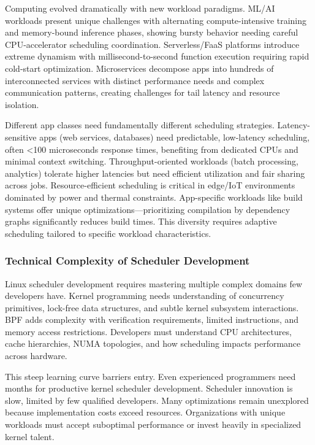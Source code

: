 Computing evolved dramatically with new workload paradigms. ML/AI workloads present unique challenges with alternating compute-intensive training and memory-bound inference phases, showing bursty behavior needing careful CPU-accelerator scheduling coordination. Serverless/FaaS platforms introduce extreme dynamism with millisecond-to-second function execution requiring rapid cold-start optimization. Microservices decompose apps into hundreds of interconnected services with distinct performance needs and complex communication patterns, creating challenges for tail latency and resource isolation.

Different app classes need fundamentally different scheduling strategies. Latency-sensitive apps (web services, databases) need predictable, low-latency scheduling, often <100 microseconds response times, benefiting from dedicated CPUs and minimal context switching. Throughput-oriented workloads (batch processing, analytics) tolerate higher latencies but need efficient utilization and fair sharing across jobs. Resource-efficient scheduling is critical in edge/IoT environments dominated by power and thermal constraints. App-specific workloads like build systems offer unique optimizations—prioritizing compilation by dependency graphs significantly reduces build times. This diversity requires adaptive scheduling tailored to specific workload characteristics.

\subsubsection{Technical Complexity of Scheduler Development}

Linux scheduler development requires mastering multiple complex domains few developers have. Kernel programming needs understanding of concurrency primitives, lock-free data structures, and subtle kernel subsystem interactions. BPF adds complexity with verification requirements, limited instructions, and memory access restrictions. Developers must understand CPU architectures, cache hierarchies, NUMA topologies, and how scheduling impacts performance across hardware.

This steep learning curve barriers entry. Even experienced programmers need months for productive kernel scheduler development. Scheduler innovation is slow, limited by few qualified developers. Many optimizations remain unexplored because implementation costs exceed resources. Organizations with unique workloads must accept suboptimal performance or invest heavily in specialized kernel talent.

